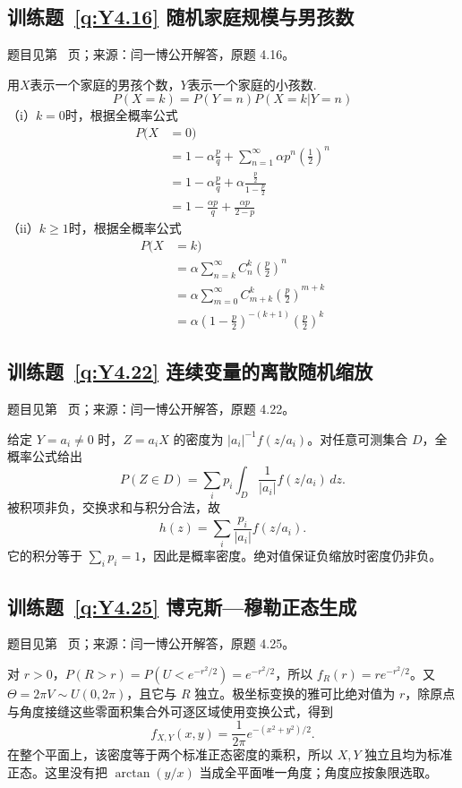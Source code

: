 \subsection*{训练题~\ref{q:Y4.16} 随机家庭规模与男孩数}\label{a:Y4.16}{\small 题目见第~\pageref{q:Y4.16} 页；来源：闫一博公开解答，原题 4.16。}
\begin{solve}
用$X$表示一个家庭的男孩个数，$Y$表示一个家庭的小孩数.    
\[P(X = k) = P(Y = n)P(X = k|Y = n)\]
    （i）$k=0$时，根据全概率公式
    \[\begin{aligned}P(X &= 0) \\&= 1 - \alpha \frac{p}{q} + {\sum\limits_{n = 1}^\infty  {\alpha {p^n}\left( {\frac{1}{2}} \right)} ^n} \\&= 1 - \alpha \frac{p}{q} + \alpha \frac{{\frac{p}{2}}}{{1 - \frac{p}{2}}} \\&= 1 - \frac{{\alpha p}}{q} + \frac{{\alpha p}}{{2 - p}}\end{aligned}\]
    （ii）$k\geqslant 1$时，根据全概率公式
    \[\begin{aligned}P(X &= k) \\&= \alpha {\sum\limits_{n = k}^\infty  {C_n^k\left( {\frac{p}{2}} \right)} ^n} \\&= \alpha {\sum\limits_{m = 0}^\infty  {C_{m + k}^k\left( {\frac{p}{2}} \right)} ^{m + k}} \\&= \alpha {\left( {1 - \frac{p}{2}} \right)^{ - (k + 1)}}{\left( {\frac{p}{2}} \right)^k}\end{aligned}\]
\end{solve}

\subsection*{训练题~\ref{q:Y4.22} 连续变量的离散随机缩放}\label{a:Y4.22}{\small 题目见第~\pageref{q:Y4.22} 页；来源：闫一博公开解答，原题 4.22。}
\begin{solve}给定 $Y=a_i\ne0$ 时，$Z=a_iX$ 的密度为 $|a_i|^{-1}f(z/a_i)$。对任意可测集合 $D$，全概率公式给出\[P(Z\in D)=\sum_i p_i\int_D\frac1{|a_i|}f(z/a_i)\,dz.\]被积项非负，交换求和与积分合法，故\[h(z)=\sum_i\frac{p_i}{|a_i|}f(z/a_i).\]它的积分等于 $\sum_i p_i=1$，因此是概率密度。绝对值保证负缩放时密度仍非负。\end{solve}

\subsection*{训练题~\ref{q:Y4.25} 博克斯—穆勒正态生成}\label{a:Y4.25}{\small 题目见第~\pageref{q:Y4.25} 页；来源：闫一博公开解答，原题 4.25。}
\begin{solve}对 $r>0$，$P(R>r)=P(U<e^{-r^2/2})=e^{-r^2/2}$，所以 $f_R(r)=re^{-r^2/2}$。又 $\Theta=2\pi V\sim U(0,2\pi)$，且它与 $R$ 独立。极坐标变换的雅可比绝对值为 $r$，除原点与角度接缝这些零面积集合外可逐区域使用变换公式，得到\[f_{X,Y}(x,y)=\frac1{2\pi}e^{-(x^2+y^2)/2}.\]在整个平面上，该密度等于两个标准正态密度的乘积，所以 $X,Y$ 独立且均为标准正态。这里没有把 $\arctan(y/x)$ 当成全平面唯一角度；角度应按象限选取。\end{solve}

